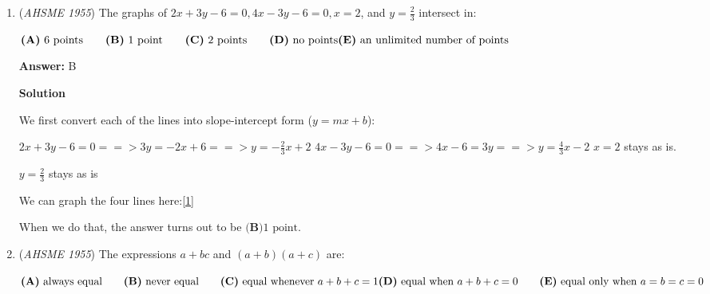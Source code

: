 \begin{enumerate}
Let our geometric sequence be $a,ar,ar^2$ and let our arithmetic sequence be $0,d,2d$. We know that 
 \[\begin{cases} a+0=1 \\ ar+d=1\\ ar^2+2d=2\end{cases}\]This implies that $a=1$, hence $r+d=1$ and $r^2+2d=2$. We can rewrite $r+d=1$ as $d = 1-r$, plugging this into $r^2+2d=2$, we get $r^2+2-2r = 2$, we can simplify this to get $r(r-2)=0$, so $r=0$ or $2$. But since $r\neq 0$, $r=2$ and $d=-1$. So our two sequences are $\{1-n\}$ and $\{2^{n-1}\}$, which means the third sequence will be 
 \[\{2^{n-1}+n+1\}=\{1,1,2,5,12,27,\dots\}\]Calculating the sum of the first 10 terms and adding them up yields 978, hence our answer is $\fbox{A}$.

 


	\item (\textit{AHSME 1955}) The graphs of $2x+3y-6=0, 4x-3y-6=0, x=2$, and $y=\frac{2}{3}$ intersect in: 


 $\textbf{(A)}\ \text{6 points}\qquad\textbf{(B)}\ \text{1 point}\qquad\textbf{(C)}\ \text{2 points}\qquad\textbf{(D)}\ \text{no points}\\ \textbf{(E)}\ \text{an unlimited number of points}$

 \textbf{Answer: }B



\textbf{Solution}

We first convert each of the lines into slope-intercept form ($y = mx + b$):

 $2x+3y-6=0 ==> 3y = -2x + 6 ==> y = -\frac{2}{3}x + 2$
$4x - 3y - 6 = 0 ==> 4x - 6 = 3y ==> y = \frac{4}{3}x - 2$
$x = 2$ stays as is.

 $y = \frac{2}{3}$ stays as is

 We can graph the four lines here:\href{https://www.desmos.com/calculator/ukceuatbb2}{[1]}

 When we do that, the answer turns out to be $\boxed{\textbf{(B)} \text{1 point}}$.

 


	\item (\textit{AHSME 1955}) The expressions $a+bc$ and $(a+b)(a+c)$ are: 


 $\textbf{(A)}\ \text{always equal}\qquad\textbf{(B)}\ \text{never equal}\qquad\textbf{(C)}\ \text{equal whenever }a+b+c=1\\ \textbf{(D)}\ \text{equal when }a+b+c=0\qquad\textbf{(E)}\ \text{equal only when }a=b=c=0$


\end{enumerate}
